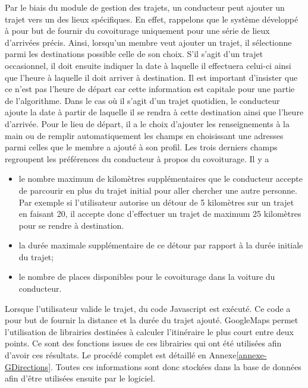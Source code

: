 \documentclass[12pt, a4paper, oneside]{article}
\begin{document}
    \indent Par le biais du module de gestion des trajets, un conducteur peut ajouter un trajet vers un des lieux spécifiques. En effet, rappelons que le système développé à pour but de fournir du covoiturage uniquement pour une série de lieux d'arrivées précis. Ainsi, lorsqu'un membre veut ajouter un trajet, il sélectionne parmi les destinations possible celle de son choix. S'il s'agit d'un trajet occasionnel, il doit ensuite indiquer la date à laquelle il effectuera celui-ci ainsi que l'heure à laquelle il doit arriver à destination. Il est important d'insister que ce n'est pas l'heure de départ car cette information est capitale pour une partie de l'algorithme. Dans le cas où il s'agit d'un trajet quotidien, le conducteur ajoute la date à partir de laquelle il se rendra à cette destination ainsi que l'heure d'arrivée. Pour le lieu de départ, il a le choix d'ajouter les renseignements à la main ou de remplir automatiquement les champs en choisissant une adresses parmi celles que le membre a ajouté à son profil. Les trois derniers champs regroupent les préférences du conducteur à propos du covoiturage. Il y a \\
    \begin{itemize}
        \item le nombre maximum de kilomètres supplémentaires que le conducteur accepte de parcourir en plus du trajet initial pour aller chercher une autre personne. Par exemple si l'utilisateur autorise un détour de 5 kilomètres sur un trajet en faisant 20, il accepte donc d'effectuer un trajet de maximum 25 kilomètres pour se rendre à destination.\\
        \item la durée maximale supplémentaire de ce détour par rapport à la durée initiale du trajet;\\
        \item le nombre de places disponibles pour le covoiturage dans la voiture du conducteur.\\
    \end{itemize}
    Lorsque l'utilisateur valide le trajet, du code Javascript est exécuté. Ce code a pour but de fournir la distance et la durée du trajet ajouté. GoogleMaps permet l'utilisation de librairies destinées à calculer l'itinéraire le plus court entre deux points. Ce sont des fonctions issues de ces librairies qui ont été utilisées afin d'avoir ces résultats. Le procédé complet est détaillé en Annexe\ref{annexe-GDirections}. Toutes ces informations sont donc stockées dans la base de données afin d'être utilisées ensuite par le logiciel.\\\\
\end{document}
